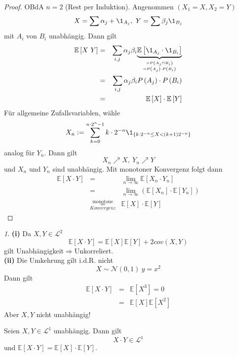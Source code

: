 \documentclass[10pt,a4paper]{report}
\numberwithin{equation}{section}
\numberwithin{figure}{section}
\theoremstyle{plain}
\theoremstyle{definition}
\theoremstyle{plain}
\theoremstyle{definition}
\theoremstyle{remark}
\newtheorem{rem}[thm]{\protect\remarkname}
\theoremstyle{plain}
\providecommand{\remarkname}{Bemerkung}
\begin{document}
\begin{proof}
OBdA $n=2$ (Rest per Induktion). Angenommen $\left(X_{1}=X,X_{2}=Y\right)$
\[
X=\sum\alpha_{j}+\1_{A_{j}},\ Y=\sum\beta_{j}\1_{B_{j}}
\]
mit $A_{i}$ von $B_{i}$ unabhängig. Dann gilt
\begin{eqnarray*}
\mathbb{E}\left[X\ Y\right] & = & \sum_{i,j}\alpha_{j}\beta_{i}\underset{{=P\left(A_{j}\cap B_{i}\right)\atop =P\left(A_{j}\right)\cdot P\left(B_{i}\right)}}{\underbrace{\mathbb{E}\left[\1_{A_{j}}\cdot\1_{B_{i}}\right]}}\\
 & = & \sum_{i,j}\alpha_{j}\beta_{i}P\left(A_{j}\right)\cdot P\left(B_{i}\right)\\
 & = & \mathbb{E}\left[X\right]\cdot\mathbb{E}\left[Y\right]
\end{eqnarray*}
Für allgemeine Zufallsvariablen, wähle 
\[
X_{n}:=\sum_{k=0}^{n\cdot2^{n}-1}k\cdot2^{-n}\1_{\left\{ k\cdot2^{-n}\leq X<\left(k+1\right)2^{-n}\right\} }
\]
analog für $Y_{n}$. Dann gilt
\[
X_{n}\nearrow X,\ Y_{n}\nearrow Y
\]
und $X_{n}$ und $Y_{n}$ sind unabhängig. Mit monotoner Konvergenz
folgt dann
\begin{eqnarray*}
\mathbb{E}\left[X\cdot Y\right] & = & \lim_{n\to\infty}\mathbb{E}\left[X_{n}\cdot Y_{n}\right]\\
 & = & \lim_{n\to\infty}\left(\mathbb{E}\left[X_{n}\right]\cdot\mathbb{E}\left[Y_{n}\right]\right)\\
 & \overset{\text{monotone}}{\underset{Konvergenz}{=}} & \mathbb{E}\left[X\right]\cdot\mathbb{E}\left[Y\right]
\end{eqnarray*}
\end{proof}
\begin{rem}
\textbf{(i)} Da $X,Y\in\mathcal{L}^{2}$
\[
\mathbb{E}\left[X\cdot Y\right]=\mathbb{E}\left[X\right]\mathbb{E}\left[Y\right]+2cov\left(X,Y\right)
\]
gilt Unabhängigkeit$\Rightarrow$Unkorreliert.\\
\textbf{(ii)} Die Umkehrung gilt i.d.R. nicht
\[
X\sim\mathcal{N}\left(0,1\right)\ y=x^{2}
\]
Dann gilt
\begin{eqnarray*}
\mathbb{E}\left[X\cdot Y\right] & = & \mathbb{E}\left[X^{3}\right]=0\\
 & = & \mathbb{E}\left[X\right]\mathbb{E}\left[X^{2}\right]
\end{eqnarray*}
Aber $X,Y$ nicht unabhängig!\end{rem}
\begin{cor}
Seien $X,Y\in\mathcal{L}^{1}$ unabhängig. Dann gilt
\[
X\cdot Y\in\mathcal{L}^{1}
\]
und $\mathbb{E}\left[X\cdot Y\right]=\mathbb{E}\left[X\right]\cdot\mathbb{E}\left[Y\right]$.
\end{cor}
\end{document}
